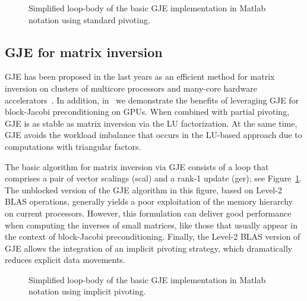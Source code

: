 \begin{figure}
\begin{center}
\begin{minipage}{\columnwidth}
{\small

}
\end{minipage}
\caption{Simplified loop-body of the basic GJE implementation in Matlab
    notation using standard pivoting.}
\label{fig:gje}
\end{center}
\end{figure}
\subsection{GJE for matrix inversion}\label{sec:gauss-jordan}

GJE has been proposed in the last years
as an efficient method for matrix inversion on 
clusters of multicore processors and many-core hardware accelerators~\cite{doi:10.1137/S1064827598345679,CPE:CPE2933}.
In addition, in~\cite{Anzt:2017:BGE:3026937.3026940} we demonstrate the benefits of {leveraging} GJE 
for block-Jacobi preconditioning on GPUs.
When combined with partial pivoting, GJE is as stable as matrix inversion via the LU factorization. 
At the same time, GJE avoids the workload imbalance that occurs in the LU-based approach 
{due to computations with}
triangular factors.

The basic algorithm for matrix inversion via GJE consists of
a loop that comprises a pair of vector scalings ({\sc scal}) and a rank-1
update ({\sc ger}); see Figure~\ref{fig:gje}.
The unblocked version of the GJE algorithm in this figure, based
on Level-2 BLAS operations,
generally yields a poor exploitation of the memory hierarchy on current processors.
However, this formulation can
deliver good performance when computing the inverses of small matrices,
like {those that usually appear}
in the context of block-Jacobi preconditioning. 
Finally, the Level-2 BLAS version of GJE allows {the integration of} an implicit pivoting strategy,
which dramatically reduces explicit data movements.


\begin{figure}
\begin{center}
\begin{minipage}{\columnwidth}
{\small

}
\end{minipage}
\caption{Simplified loop-body of the basic GJE implementation in Matlab
    notation using implicit pivoting.}
\label{fig:gje2}
\end{center}
\end{figure}

